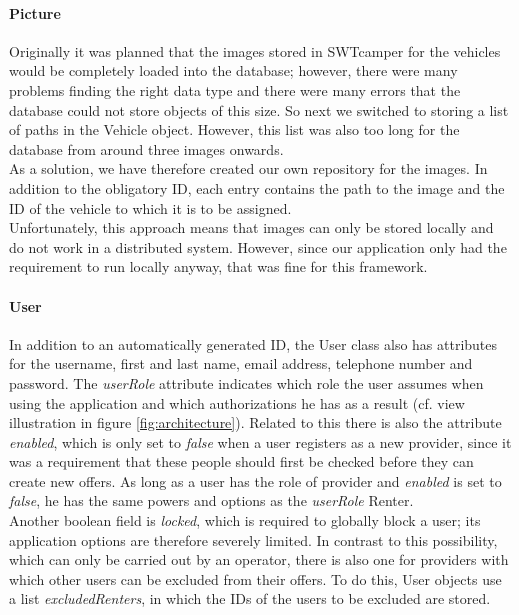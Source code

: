 \paragraph{Picture}
Originally it was planned that the images stored in SWTcamper for the vehicles would be completely loaded into the database; however, there were many problems finding the right data type and there were many errors that the database could not store objects of this size. So next we switched to storing a list of paths in the Vehicle object. However, this list was also too long for the database from around three images onwards. \\
As a solution, we have therefore created our own repository for the images. In addition to the obligatory ID, each entry contains the path to the image and the ID of the vehicle to which it is to be assigned. \\
Unfortunately, this approach means that images can only be stored locally and do not work in a distributed system. However, since our application only had the requirement to run locally anyway, that was fine for this framework.

\paragraph{User}
In addition to an automatically generated ID, the User class also has attributes for the username, first and last name, email address, telephone number and password. The \textit{userRole} attribute indicates which role the user assumes when using the application and which authorizations he has as a result (cf. view illustration in figure \ref{fig:architecture}). Related to this there is also the attribute \textit{enabled}, which is only set to \textit{false} when a user registers as a new provider, since it was a requirement that these people should first be checked before they can create new offers. As long as a user has the role of provider and \textit{enabled} is set to \textit{false}, he has the same powers and options as the \textit{userRole} Renter. \\
Another boolean field is \textit{locked}, which is required to globally block a user; its application options are therefore severely limited. In contrast to this possibility, which can only be carried out by an operator, there is also one for providers with which other users can be excluded from their offers. To do this, User objects use a list \textit{excludedRenters}, in which the IDs of the users to be excluded are stored.

